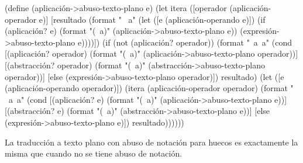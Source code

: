 \documentclass[letterpaper,twoside,openright,11pt]{book}
\begin{document}
\nwenddocs{}\plusendmoddef
(define (aplicación->abuso-texto-plano e)
  (let itera ([operador (aplicación-operador e)]
              [resultado (format " ~a"
                                 (let ([e (aplicación-operando e)])
                                   (if (aplicación? e)
                                       (format "(~a)" (aplicación->abuso-texto-plano e))
                                       (expresión->abuso-texto-plano e))))])
    (if (not (aplicación? operador))
        (format "~a~a"
                (cond [(aplicación? operador)
                       (format "(~a)" (aplicación->abuso-texto-plano operador))]
                      [(abstracción? operador)
                       (format "(~a)" (abstracción->abuso-texto-plano operador))]
                      [else
                       (expresión->abuso-texto-plano operador)])
                resultado)
        (let ([e (aplicación-operando operador)])
          (itera (aplicación-operador operador)
                 (format " ~a~a"
                         (cond [(aplicación? e)
                                (format "(~a)" (aplicación->abuso-texto-plano e))]
                               [(abstracción? e)
                                (format "(~a)" (abstracción->abuso-texto-plano e))]
                               [else
                                (expresión->abuso-texto-plano e)])
                         resultado))))))

\eatline
{}\nwendcode{}\nwdocspar

La traducción a texto plano con abuso de notación para huecos es exactamente la misma que cuando no se tiene abuso de notación.
\end{document}
